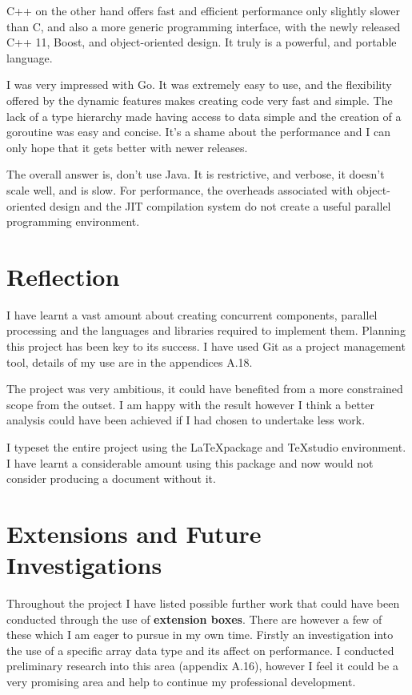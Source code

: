 \documentclass[11pt]{article} %
\begin{document}
C++ on the other hand offers fast and efficient performance only slightly slower than C, and also a more generic programming interface, with the newly released C++ 11, Boost, and object-oriented design. It truly is a powerful, and portable language.

I was very impressed with Go. It was extremely easy to use, and the flexibility offered by the dynamic features makes creating code very fast and simple. The lack of a type hierarchy made having access to data simple and the creation of a goroutine was easy and concise. It's a shame about the performance and I can only hope that it gets better with newer releases.

The overall answer is, don't use Java. It is restrictive, and verbose, it doesn't scale well, and is slow. For performance, the overheads associated with object-oriented design and the JIT compilation system do not create a useful parallel programming environment. 

\section*{Reflection}
I have learnt a vast amount about creating concurrent components, parallel processing and the languages and libraries required to implement them. Planning this project has been key to its success. I have used Git as a project management tool, details of my use are in the appendices A.18.

The project was very ambitious, it could have benefited from a more constrained scope from the outset. I am happy with the result however I think a better analysis could have been achieved if I had chosen to undertake less work.

I typeset the entire project using the \LaTeX package and TeXstudio environment. I have learnt a considerable amount using this package and now would not consider producing a document without it.
\section*{Extensions and Future Investigations}
Throughout the project I have listed possible further work that could have been conducted through the use of {\bf extension boxes}. There are however a few of these which I am eager to pursue in my own time. Firstly an investigation into the use of a specific array data type and its affect on performance. I conducted preliminary research into this area (appendix A.16), however I feel it could be a very promising area and help to continue my professional development.
\end{document}
